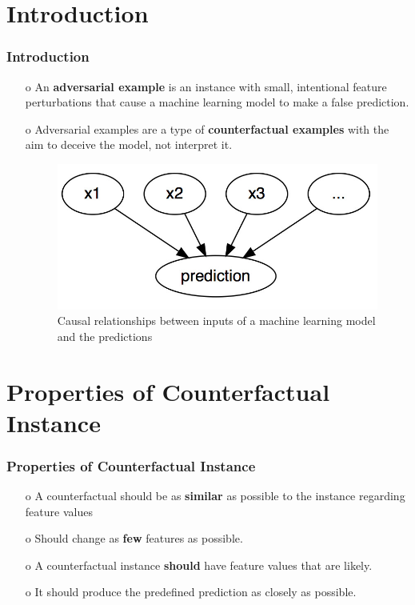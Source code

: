 \documentclass[14pt]{beamer}
\begin{document}
\section{Introduction}
\begin{frame}
\frametitle{Introduction}
	\begin{itemize}
		\item[o] An \textbf{adversarial example} is an instance with small, intentional feature perturbations that cause a machine learning model to make a false prediction.\protect\footnotemark
		
		\item[o] Adversarial examples are a type of \textbf{counterfactual examples} with the aim to deceive the model, not interpret it.
		
		\begin{figure}
			\centering
			\includegraphics[width=0.7\linewidth]{img/graph}
			\caption{Causal relationships between inputs of a machine learning model and the predictions}
			\label{fig:graph}
		\end{figure}
		
	\end{itemize}
	
\end{frame}

\section{Properties of Counterfactual Instance}
\begin{frame}
\frametitle{Properties of Counterfactual Instance}
\begin{itemize}
	\item[o] A counterfactual should be as \textbf{similar} as possible to the instance regarding feature values
	\item[o] Should change as \textbf{few} features as possible.
	\item[o] A counterfactual instance \textbf{should} have feature values that are likely.
	\item[o] It should produce the predefined prediction as closely as possible.
\end{itemize}
\end{frame}
\end{document}
